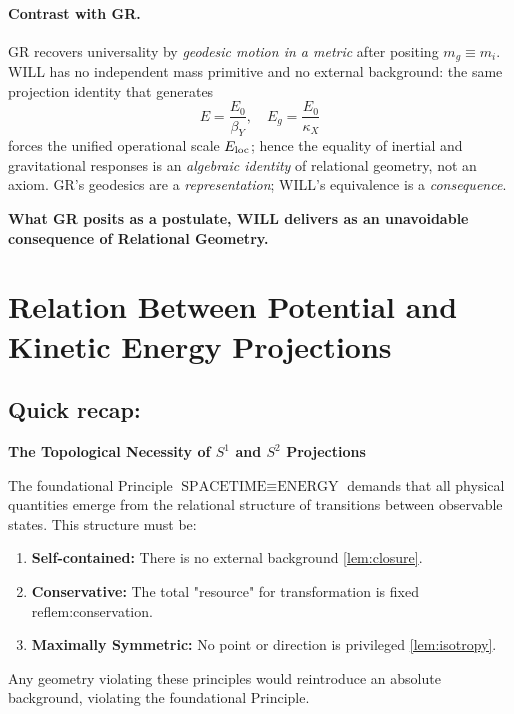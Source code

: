 \documentclass[12pt, a4paper]{article}
\begin{document}
\paragraph{Contrast with GR.}
GR recovers universality by \emph{geodesic motion in a metric} after positing $m_g\equiv m_i$.
WILL has no independent mass primitive and no external background: the same projection identity that generates 
\[
E=\frac{E_0}{\beta_Y},\quad E_g=\frac{E_0}{\kappa_X}
\]
forces the unified operational scale $E_{\rm loc}$; hence the equality of inertial and gravitational responses is an \emph{algebraic identity} of relational geometry, not an axiom. 
GR’s geodesics are a \emph{representation}; WILL’s equivalence is a \emph{consequence}.

\begin{tcolorbox}[colback=gray!5, colframe=black!80!black, title=Summary:]
\textbf{What GR posits as a postulate, WILL delivers as an unavoidable consequence of Relational Geometry.}
\end{tcolorbox}

\section{Relation Between Potential and Kinetic Energy Projections}

\subsection{Quick recap: }

  \textbf{ The Topological Necessity of \(S^1\) and \(S^2\) Projections}

The foundational Principle \(\text{SPACETIME} \equiv \text{ENERGY}\) demands that all physical quantities emerge from the relational structure of transitions between observable states. This structure must be:
\begin{enumerate}
    \item \textbf{Self-contained:} There is no external background \ref{lem:closure}.
    \item \textbf{Conservative:} The total "resource" for transformation is fixed ref{lem:conservation}.
    \item \textbf{Maximally Symmetric:} No point or direction is privileged \ref{lem:isotropy}.
\end{enumerate}
 
Any geometry violating these principles would reintroduce an absolute background, violating the foundational Principle.
\end{document}
